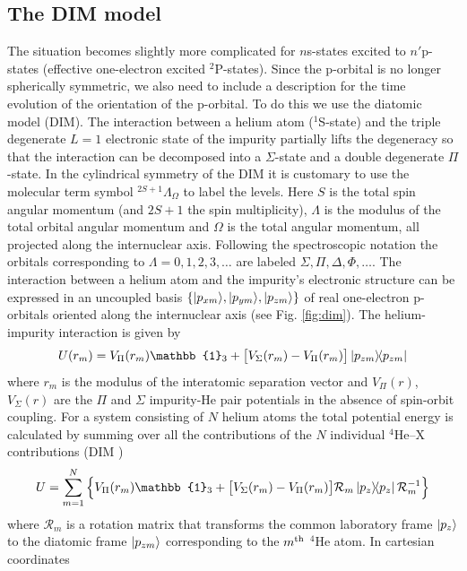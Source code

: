 \documentclass[12pt,a4paper,twosides]{book}
\begin{document}
		\subsection{The DIM model}	
			The situation becomes slightly more complicated for $n$s-states excited to $n'$p-states (effective one-electron excited $^2$P-states). Since the p-orbital is no longer spherically symmetric, we also need to include a description for the time evolution of the orientation of the p-orbital. To do this we use the diatomic model (DIM). The interaction between a helium atom ($^1$S-state) and the triple degenerate $L=1$ electronic state of the impurity partially lifts the degeneracy so that the interaction can be decomposed into a $\Sigma$-state and a double degenerate $\Pi$-state. In the cylindrical symmetry of the DIM it is customary to use the molecular term symbol $^{2S+1}\Lambda_\Omega$ to label the levels. Here $S$ is the total spin angular momentum (and $2S+1$ the spin multiplicity), $\Lambda$ is the modulus of the total orbital angular momentum and $\Omega$ is the total angular momentum, all projected along the internuclear axis. Following the spectroscopic notation the orbitals corresponding to $\Lambda=0,1,2,3,\ldots$ are labeled $\Sigma,\Pi,\Delta,\Phi,\ldots$. The interaction between a helium atom and the impurity's electronic structure can be expressed in an uncoupled basis $\qty{\ket{p_{xm}}\!,\ket{p_{ym}}\!,\ket{p_{zm}}}$ of real one-electron p-orbitals oriented along the internuclear axis (see Fig. \ref{fig:dim}). The helium-impurity interaction is given by
			\begin{align}
				U(r_m)= V_{\Pi}(r_m)\mathbb{1}_3+\qty\big[V_{\Sigma}(r_m)-V_{\Pi}(r_m)]\dyad{p_{zm}} \label{eq37}
			\end{align}	
			where $r_m$ is the modulus of the interatomic separation vector and $V_\Pi(r)$, $V_\Sigma(r)$ are the $\Pi$ and $\Sigma$ impurity-He pair potentials in the absence of spin-orbit coupling. For a system consisting of $N$ helium atoms the total potential energy is calculated by summing over all the contributions of the $N$ individual $^4$He--X contributions (DIM \cite{82})
			\begin{align}
				U=\sum_{m=1}^{N}\qty\Big{V_\Pi(r_m)\mathbb{1}_3+\qty\big[V_\Sigma(r_m)- V_\Pi(r_m)] \mathcal{R}_m \dyad{p_z} \mathcal{R}^{-1}_m}	\label{eq38}
			\end{align}
			where $\mathcal{R}_m$ is a rotation matrix that transforms the common laboratory frame $\ket{p_z}$ to the diatomic frame $\ket{p_{zm}}$ corresponding to the $m^{\rm th}$ $^4$He atom. In cartesian coordinates
\end{document}
